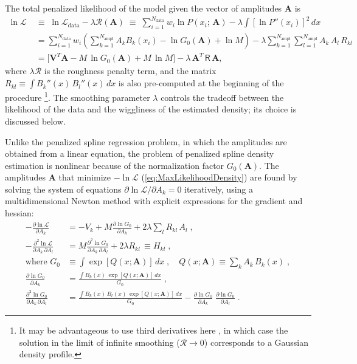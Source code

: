 \documentclass[12pt]{article}
\renewcommand{\d}{\partial}
\newcommand{\bA}{\boldsymbol{A}}
\begin{document}
The total penalized likelihood of the model given the vector of amplitudes $\bA$ is
\begin{align}
\ln\mathcal{L}\; &\equiv\; \ln\mathcal{L}_\mathrm{data} - \lambda \mathcal{R}(\bA) \;\equiv\;
\sum_{i=1}^{N_\mathrm{data}}  w_i  \ln P(x_i;\,\bA) - \lambda \int \left[\ln P''(x_i)\right]^2 \,dx \nonumber \\
&= \sum_{i=1}^{N_\mathrm{data}} w_i \left(\sum_{k=1}^{N_\mathrm{ampl}} A_k B_k(x_i) - \ln G_0(\bA) + \ln M \right) - \lambda \sum_{k=1}^{N_\mathrm{ampl}} \sum_{l=1}^{N_\mathrm{ampl}} A_k\,A_l\,R_{kl}  \nonumber\\
&= \big[ \boldsymbol{V}^T\bA - M\, \ln G_0(\bA)  + M\, \ln M \big] - \lambda\,\bA^T\,\mathsf{R}\,\bA ,
\label{eq:MaxLikelihoodDensity}
\end{align}
where $\lambda \mathcal{R}$ is the roughness penalty term, and the matrix $R_{kl}\equiv \int B_k''(x)\,B_l''(x)\,dx$ is also pre-computed at the beginning of the procedure%
\footnote{It may be advantageous to use third derivatives here \cite{Silverman1982}, in which case the solution in the limit of infinite smoothing ($\mathcal{R}\to 0$) corresponds to a Gaussian density profile.}.
The smoothing parameter $\lambda$ controls the tradeoff between the likelihood of the data and the wiggliness of the estimated density; its choice is discussed below.

Unlike the penalized spline regression problem, in which the amplitudes are obtained from a linear equation, the problem of penalized spline density estimation is nonlinear because of the normalization factor $G_0(\bA)$. The amplitudes $\bA$ that minimize $-\!\ln\mathcal{L}$ (\ref{eq:MaxLikelihoodDensity}) are found by solving the system of equations $\d \ln\mathcal{L}/\d A_k=0$ iteratively, using a multidimensional Newton method with explicit expressions for the gradient and hessian:
\begin{subequations}
\begin{align}
-\frac{\d \ln\mathcal{L}}{\d A_k} &= -V_k + M \frac{\d \ln G_0}{\d A_k} + 2\lambda \sum_l R_{kl}\,A_l \;, \label{eq:lnLgrad} \\
-\frac{\d^2 \ln\mathcal{L}}{\d A_k\, \d A_l} &= M \frac{\d^2 \ln G_0}{\d A_k\, \d A_l} + 2\lambda R_{kl} \,\equiv H_{kl}\;, \\
\mbox{where }G_0 &\equiv \int \exp[Q(x; \bA)]\,dx \;, \quad
Q(x; \bA) \equiv \sum_k  A_k\, B_k(x) \;, \nonumber \\
\frac{\d \ln G_0}{\d A_k} &= \frac{\int B_k(x)\,\exp[Q(x; \bA)]\,dx}{G_0} \;, \nonumber\\
\frac{\d^2 \ln G_0}{\d A_k\, \d A_l} &= \frac{\int B_k(x)\,B_l(x)\,\exp[Q(x; \bA)]\,dx}{G_0} - \frac{\d \ln G_0}{\d A_k}\; \frac{\d \ln G_0}{\d A_l} \;. \nonumber
\end{align}
\end{subequations}
\end{document}
